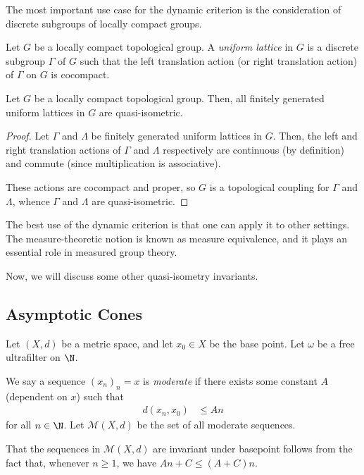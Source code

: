 \documentclass[10pt]{mypackage}
\begin{document}
The most important use case for the dynamic criterion is the consideration of discrete subgroups of locally compact groups.
\begin{definition}
  Let $G$ be a locally compact topological group. A \textit{uniform lattice} in $G$ is a discrete subgroup $\Gamma$ of $G$ such that the left translation action (or right translation action) of $\Gamma$ on $G$ is cocompact.
\end{definition}
\begin{corollary}
  Let $G$ be a locally compact topological group. Then, all finitely generated uniform lattices in $G$ are quasi-isometric.
\end{corollary}
\begin{proof}
  Let $\Gamma$ and $\Lambda$ be finitely generated uniform lattices in $G$. Then, the left and right translation actions of $\Gamma$ and $\Lambda$ respectively are continuous (by definition) and commute (since multiplication is associative).

  These actions are cocompact and proper, so $G$ is a topological coupling for $\Gamma$ and $\Lambda$, whence $\Gamma$ and $\Lambda$ are quasi-isometric.
\end{proof}
The best use of the dynamic criterion is that one can apply it to other settings. The measure-theoretic notion is known as measure equivalence, and it plays an essential role in measured group theory.

Now, we will discuss some other quasi-isometry invariants.
\subsection{Asymptotic Cones}%
Let $\left( X,d \right)$ be a metric space, and let $x_0\in X$ be the base point. Let $\omega$ be a free ultrafilter on $\N$.
\begin{definition}
  We say a sequence $\left( x_n \right)_n = x$ is \textit{moderate} if there exists some constant $A$ (dependent on $x$) such that
  \begin{align*}
    d\left( x_n,x_0 \right) &\leq An
  \end{align*}
  for all $n\in \N$. Let $\mathcal{M}\left( X,d \right)$ be the set of all moderate sequences.
\end{definition}
That the sequences in $ \mathcal{M}\left( X,d \right) $ are invariant under basepoint follows from the fact that, whenever $n\geq 1$, we have $An + C \leq \left( A+C \right)n$.
\end{document}
